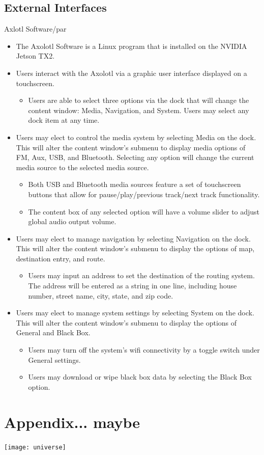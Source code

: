 \documentclass[onecolumn, draftclsnofoot,10pt, compsoc]{IEEEtran}
\begin{document}
\subsection{External Interfaces}
Axlotl Software/par
\begin{itemize}
	\item The Axolotl Software is a Linux program that is installed on the NVIDIA Jetson TX2.
	\item Users interact with the Axolotl via a graphic user interface displayed on a touchscreen.
	\begin{itemize}
		\item Users are able to select three options via the dock that will change the content window: Media, Navigation, and System. Users may select any dock item at any time.
	\end{itemize}
	\item Users may elect to control the media system by selecting Media on the dock. This will alter the content window’s submenu to display media options of FM, Aux, USB, and Bluetooth. Selecting any option will change the current media source to the selected media source.
	\begin{itemize}
		\item Both USB and Bluetooth media sources feature a set of touchscreen buttons that allow for pause/play/previous track/next track functionality.
		\item The content box of any selected option will have a volume slider to adjust global audio output volume.
	\end{itemize}
	\item Users may elect to manage navigation by selecting Navigation on the dock. This will alter the content window’s submenu to display the options of map, destination entry, and route.
	\begin{itemize}
		\item Users may input an address to set the destination of the routing system. The address will be entered as a string in one line, including house number, street name, city, state, and zip code.
	\end{itemize}
	\item Users may elect to manage system settings by selecting System on the dock. This will alter the content window’s submenu to display the options of General and Black Box.
	\begin{itemize}
		\item Users may turn off the system’s wifi connectivity by a toggle switch under General settings.
		\item Users may download or wipe black box data by selecting the Black Box option.
	\end{itemize}
\end{itemize}

\section{Appendix... maybe}
\texttt{[image: universe]}
\end{document}
